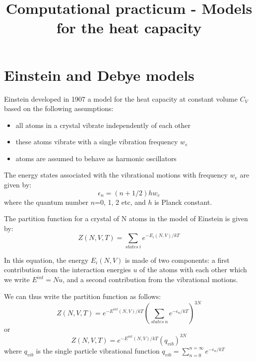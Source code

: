 \documentclass[english]{article}
\begin{document}
\title{Computational practicum - Models for the heat capacity}



\maketitle


\section{Einstein and Debye models}

Einstein developed in 1907 a model for the heat capacity at constant volume $C_V$ based on the following assumptions:
\begin{itemize}
\item all atoms in a crystal vibrate independently of each other
\item these atoms vibrate with a single vibration frequency $w_e$
\item atoms are assumed to behave as harmonic oscillators
\end{itemize}

The energy states associated with the vibrational motions with frequency $w_e$ are given by:
\begin{equation}
\epsilon_n = (n + 1/2)hw_e
\end{equation}
where the quantum number $n$=0, 1, 2 etc, and $h$ is Planck constant. 

The partition function for a crystal of N atoms in the model of Einstein is given by:
\begin{equation}
Z(N, V, T) = \sum_{states~i}e^{-E_i(N, V)/kT}
\end{equation}

In this equation, the energy $E_i(N, V)$ is made of two components: a first contribution from the interaction energies $u$ of the atoms with each other which we write $E^{int}=Nu$, and a second contribution from the vibrational motions.

We can thus write the partition function as follows:
\begin{equation}
Z(N, V, T) = e^{-E^{int}(N, V)/kT}(\sum_{states~n}e^{-\epsilon_n/kT})^{3N} 
\end{equation}
or
\begin{equation}
Z(N, V, T) = e^{-E^{int}(N, V)/kT}(q_{vib})^{3N}
\end{equation}					
where $q_{vib}$ is the single particle vibrational function $q_{vib}=\sum_{n=0}^{n=\infty}e^{-\epsilon_n/kT}$
\end{document}
